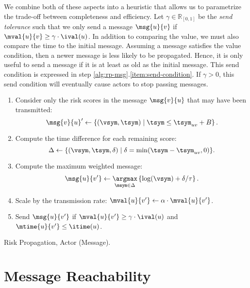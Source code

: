 \par We combine both of these aspects into a heuristic that allows us to parametrize the trade-off between completeness and efficiency. Let $\gamma \in \mathbb{R}_{[0, 1]}$ be the \emph{send tolerance} such that we only send a message $\msg{u}{v}$ if $\mval{u}{v} \geq \gamma \cdot \ival(u)$. In addition to comparing the value, we must also compare the time to the initial message. Assuming a message satisfies the value condition, then a newer message is less likely to be propagated. Hence, it is only useful to send a message if it is at least as old as the initial message. This send condition is expressed in step \ref{alg:rp-msg}.\ref{item:send-condition}. If $\gamma > 0$, this send condition will eventually cause actors to stop passing messages.
\begin{algorithm}[tb]
	\begin{enumerate}
		\item Consider only the risk scores in the message $\msg{v}{u}$ that may have been transmitted: \label{item:filter}
		\begin{displaymath}
			\msg{v}{u}' \leftarrow \left\{(\vsym, \tsym) \mid \tsym \leq \tsym_{uv} + B \right\}.
		\end{displaymath}
		\item Compute the time difference for each remaining score: \label{item:delta}
		\begin{displaymath}
			\Delta \leftarrow \{(\vsym, \tsym, \delta) \mid \delta = \min(\tsym - \tsym_{uv}, 0)\}.
		\end{displaymath}
		\item Compute the maximum weighted message: \label{item:argmax}
		\begin{displaymath}
			\msg{u}{v'} \leftarrow \underset{\msym \in \Delta}{\argmax} \left\{\log(\vsym) + \delta / \tau \right\}.
		\end{displaymath}
		\item Scale by the transmission rate: $\mval{u}{v'} \leftarrow \alpha \cdot \mval{u}{v'}$.
		\item Send $\msg{u}{v'}$ if $\mval{u}{v'} \geq \gamma \cdot \ival(u)$ and $\mtime{u}{v'} \leq \itime(u)$. \label{item:send-condition}
	\end{enumerate}
	\caption{Risk Propagation, Actor (Message).}
	\label{alg:rp-msg}
\end{algorithm}

\section{Message Reachability}\label{sec:reachability}

